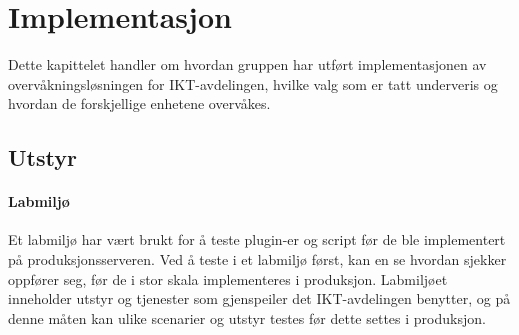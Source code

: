 \chapter{Implementasjon}

Dette kapittelet handler om hvordan gruppen har utført implementasjonen av overvåkningsløsningen for IKT-avdelingen, hvilke valg som er tatt underveris og hvordan de forskjellige enhetene overvåkes.
\section{Utstyr}

\subsubsection{Labmiljø}
Et labmiljø har vært brukt for å teste plugin-er og script før de ble implementert på produksjonsserveren. Ved å teste i et labmiljø først, kan en se hvordan sjekker oppfører seg, før de i stor skala implementeres i produksjon. Labmiljøet inneholder utstyr og tjenester som gjenspeiler det IKT-avdelingen benytter, og på denne måten kan ulike scenarier og utstyr testes før dette settes i produksjon.

